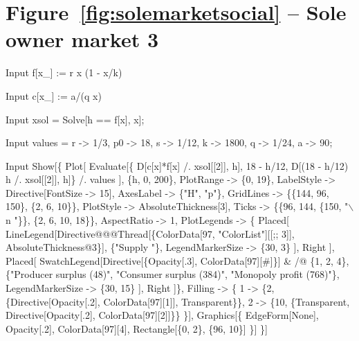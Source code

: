 \documentclass[11pt,fleqn]{book} %
\begin{document}
\section*{Figure~\ref{fig:solemarketsocial} -- Sole owner market 3 }
\small{
\begin{mmaCell}[index=1]{Input}
   f[x_] := r x (1 - x/k)
\end{mmaCell}

\begin{mmaCell}{Input}
   c[x_] := a/(q x)
\end{mmaCell}

\begin{mmaCell}{Input}
   xsol = Solve[h == f[x], x];
\end{mmaCell}

\begin{mmaCell}{Input}
   values = {r -> 1/3, p0 -> 18, s -> 1/12, k -> 1800, q -> 1/24, a -> 90};
\end{mmaCell}

\begin{mmaCell}{Input}
   Show[\{
     Plot[
       Evaluate[\{
         D[c[x]*f[x] /. xsol[[2]], h], 18 - h/12, 
         D[(18 - h/12) h /. xsol[[2]], h]\} /. values
       ],
       \{h, 0, 200\},
       PlotRange   -> \{0, 19\},
       LabelStyle  -> Directive[FontSize -> 15], 
       AxesLabel   -> \{"H", "p"\}, 
       GridLines   -> \{\{144, 96, 150\}, \{2, 6, 10\}\}, 
       PlotStyle   -> AbsoluteThickness[3], 
       Ticks       -> \{\{96, 144, \{150, "\(\backslash\)n "\}\}, \{2, 6, 10, 18\}\}, 
       AspectRatio -> 1, 
       PlotLegends -> \{
         Placed[
           LineLegend[Directive@@@Thread[\{ColorData[97, "ColorList"][[;; 3]],
             AbsoluteThickness@3\}], \{"Supply "\}, 
             LegendMarkerSize -> \{30, 3\}
           ], 
           Right
         ],
         Placed[
           SwatchLegend[Directive[\{Opacity[.3], ColorData[97][#]\}] & /@ \{1, 2, 4\},
             \{"Producer surplus (48)", 
               "Consumer surplus (384)", 
               "Monopoly profit (768)"\},
             LegendMarkerSize -> \{30, 15\}
           ],
           Right
         ]\},
       Filling     -> \{
         1 -> \{2, \{Directive[Opacity[.2], ColorData[97][1]], Transparent\}\},
         2 -> \{10, \{Transparent, Directive[Opacity[.2], ColorData[97][2]]\}\}
      \}],
      Graphics[\{
        EdgeForm[None], Opacity[.2], ColorData[97][4], 
        Rectangle[\{0, 2\}, \{96, 10\}]
      \}]
   \}]
\end{mmaCell}
}
\end{document}
